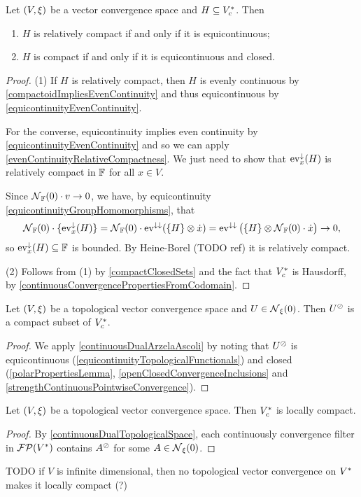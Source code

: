 \begin{lemma} \label{continuousDualArzelaAscoli}
Let $\sSet{V,\xi}$ be a vector convergence space and $H\subseteq {V}^*_c$. Then
\begin{enumerate}
\item $H$ is relatively compact \textup{if and only if} it is equicontinuous;
\item $H$ is compact \textup{if and only if} it is equicontinuous and closed.
\end{enumerate}
\end{lemma}
\begin{proof}
(1) If $H$ is relatively compact, then $H$ is evenly continuous by \ref{compactoidImpliesEvenContinuity} and thus equicontinuous by \ref{equicontinuityEvenContinuity}.

For the converse, equicontinuity implies even continuity by \ref{equicontinuityEvenContinuity} and so we can apply \ref{evenContinuityRelativeCompactness}. We just need to show that $\operatorname{ev}_x^\downarrow(H)$ is relatively compact in $\mathbb{F}$ for all $x\in V$.

Since $\operatorname{\mathcal{N}}_{\mathbb{F}}(0)\cdot v\to 0$, we have, by equicontinuity \ref{equicontinuityGroupHomomorphisms}, that
\[ \operatorname{\mathcal{N}}_{\mathbb{F}}(0)\cdot \{\operatorname{ev}_x^\downarrow(H)\} = \operatorname{\mathcal{N}}_{\mathbb{F}}(0)\cdot \operatorname{ev}^{\downarrow\downarrow}(\{H\}\otimes \dot{x}) = \operatorname{ev}^{\downarrow\downarrow}\big(\{H\}\otimes \operatorname{\mathcal{N}}_{\mathbb{F}}(0)\cdot \dot{x}\big) \to 0, \]
so $\operatorname{ev}_x^\downarrow(H)\subseteq \mathbb{F}$ is bounded. By Heine-Borel (TODO ref) it is relatively compact.

(2) Follows from (1) by \ref{compactClosedSets} and the fact that ${V}^*_c$ is Hausdorff, by \ref{continuousConvergencePropertiesFromCodomain}.
\end{proof}

\begin{proposition}
Let $\sSet{V,\xi}$ be a topological vector convergence space and $U\in \operatorname{\mathcal{N}}_\xi(0)$. Then $U^\oslash$ is a compact subset of ${V}^*_c$.
\end{proposition}
\begin{proof}
We apply \ref{continuousDualArzelaAscoli} by noting that $U^\oslash$ is equicontinuous (\ref{equicontinuityTopologicalFunctionals}) and closed (\ref{polarPropertiesLemma}, \ref{openClosedConvergenceInclusions} and \ref{strengthContinuousPointwiseConvergence}).
\end{proof}
\begin{corollary} \label{continuousDualTVSLocallyCompact}
Let $\sSet{V,\xi}$ be a topological vector convergence space. Then ${V}^*_c$ is locally compact.
\end{corollary}
\begin{proof}
By \ref{continuousDualTopologicalSpace}, each continuously convergence filter in $\operatorname{\mathcal{FP}}({V}^*)$ contains $A^\oslash$ for some $A\in\operatorname{\mathcal{N}}_\xi(0)$.
\end{proof}
TODO if $V$ is infinite dimensional, then no topological vector convergence on ${V}^*$ makes it locally compact (?)

